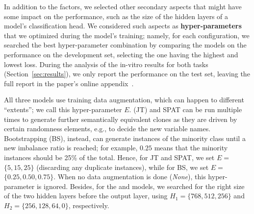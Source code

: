 In addition to the factors, we selected other secondary aspects that might have some impact on the performance, such as the size of the hidden layers of a model's classification head.
We considered such aspects as \textbf{hyper-parameters} that we optimized during the model's training; namely, for each configuration, we searched the best hyper-parameter combination by comparing the models on the performance on the development set, selecting the one having the highest \metricForDev and lowest loss.
During the analysis of the in-vitro results for both tasks (Section~\ref{sec:results}), we only report the performance on the test set, leaving the full report in the paper's online appendix~\cite{appendix}.
%

All three models use training data augmentation, which can happen to different ``extents''; we call this hyper-parameter $E$.
\JavaTransformer (JT) and SPAT can be run multiple times to generate further semantically equivalent clones as they are driven by certain randomness elements, e.g., to decide the new variable names.
Bootstrapping (BS), instead, can generate instances of the minority class until a new imbalance ratio is reached; for example, $0.25$ means that the minority instances should be 25\% of the total.
Hence, for JT and SPAT, we set $E$$=$$\{5, 15, 25\}$ (discarding any duplicate instances), while for BS, we set $E$$=$$\{0.25, 0.50, 0.75\}$.
When no data augmentation is done (\textit{None}), this hyper-parameter is ignored.
%
Besides, for the \finder and \linker models, we searched for the right size of the two hidden layers before the output layer, using $H_1$$=$$\{768, 512, 256\}$ and $H_2$$=$$\{256, 128, 64, 0\}$, respectively.

